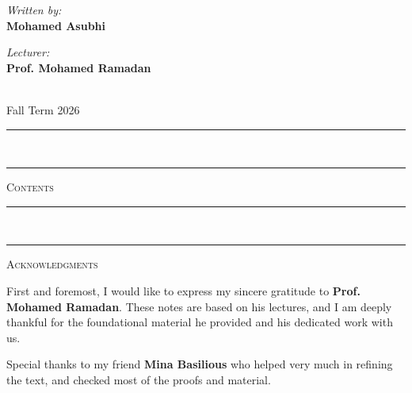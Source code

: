 \documentclass[11pt,a4paper]{article}
\begin{document}
\begin{titlepage}
\begin{tikzpicture}[scale=1.1, font=\sffamily]
		\end{tikzpicture}
		\vfill
		
		\vspace{1cm}
		\begin{minipage}{0.45\textwidth}
			\begin{flushleft}
				\textit{Written by:}\\
				\textbf{Mohamed Asubhi}
			\end{flushleft}
		\end{minipage}
		\begin{minipage}{0.45\textwidth}
			\begin{flushright}
				\textit{Lecturer:}\\
				\textbf{Prof. Mohamed Ramadan}
			\end{flushright}
		\end{minipage}\\[2.5em]
		
		{\large Fall Term 2026}
	\end{titlepage}
	
	\newpage
	
	\pagestyle{plain} 
	
	\vspace*{1em}
	\noindent\rule{\textwidth}{1.2pt} \\[-0.85\baselineskip]
	\noindent\rule{\textwidth}{0.4pt}
	\begin{center}
		\huge \textsc{Contents}
	\end{center}
	\vspace{1.5em}
	
	\tableofcontents
	
	\newpage
	\vspace*{1em}
	\noindent\rule{\textwidth}{1.2pt} \\[-0.85\baselineskip]
	\noindent\rule{\textwidth}{0.4pt}
	\begin{center}
		\huge \textsc{Acknowledgments}
	\end{center}
	\vspace{2em}
	
	{
		
		First and foremost, I would like to express my sincere gratitude to \textbf{Prof. Mohamed Ramadan}. These notes are based on his lectures, and I am deeply thankful for the foundational material he provided and his dedicated work with us.
		
		\vspace{1.5em}
		Special thanks to my friend \textbf{Mina Basilious} who helped very much in refining the text, and checked most of the proofs and material.
	}
	
\end{document}
